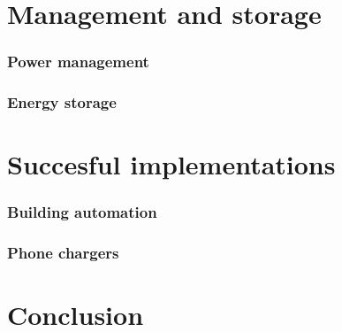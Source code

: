\documentclass{beamer}
\begin{document}
\section{Management and storage}

\begin{frame}
  \frametitle{Power management}
\end{frame}

\begin{frame}
  \frametitle{Energy storage}
\end{frame}

\section{Succesful implementations}

\begin{frame}
  \frametitle{Building automation}
\end{frame}

\begin{frame}
  \frametitle{Phone chargers}
\end{frame}

\section{Conclusion}
\end{document}
